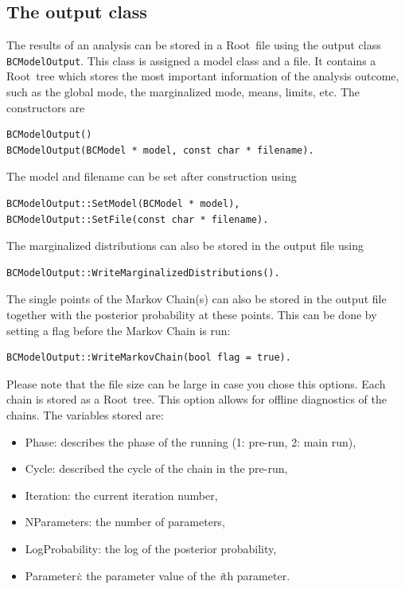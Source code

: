 \documentclass[11pt, a4paper]{article}
\newcommand{\Root}{{\sc Root}}
\begin{document}

\subsection{The output class}
\label{section:outputclass}

The results of an analysis can be stored in a \Root\ file using the
output class \verb|BCModelOutput|. This class is assigned a model
class and a file. It contains a \Root\ tree which stores the most
important information of the analysis outcome, such as the global
mode, the marginalized mode, means, limits, etc. The constructors are
%
\begin{verbatim}
BCModelOutput()
BCModelOutput(BCModel * model, const char * filename).
\end{verbatim}
%
The model and filename can be set after construction using
%
\begin{verbatim}
BCModelOutput::SetModel(BCModel * model),
BCModelOutput::SetFile(const char * filename).
\end{verbatim}
%
The marginalized distributions can also be stored in the output file
using
%
\begin{verbatim}
BCModelOutput::WriteMarginalizedDistributions().
\end{verbatim}

The single points of the Markov Chain(s) can also be stored in the
output file together with the posterior probability at these
points. This can be done by setting a flag before the Markov Chain is
run:
%
\begin{verbatim}
BCModelOutput::WriteMarkovChain(bool flag = true).
\end{verbatim}
%
Please note that the file size can be large in case you chose this
options. Each chain is stored as a \Root\ tree. This option allows for
offline diagnostics of the chains. The variables stored are:

\begin{itemize}
\item Phase: describes the phase of the running (1: pre-run, 2: main run),
\item Cycle: described the cycle of the chain in the pre-run,
\item Iteration: the current iteration number,
\item NParameters: the number of parameters,
\item LogProbability: the log of the posterior probability,
\item Parameter{\it i}: the parameter value of the \textit{i}th parameter.
\end{itemize}
\end{document}
